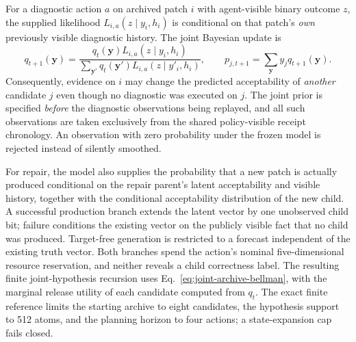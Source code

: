 \documentclass[pdflatex,sn-basic]{sn-jnl}
\begin{document}
For a diagnostic action $a$ on archived patch $i$ with
agent-visible binary outcome $z$, the supplied likelihood
$L_{i,a}(z\mid y_i,h_i)$ is conditional on that patch's
\emph{own} previously visible diagnostic history.
The joint Bayesian update is
\begin{equation}
 q_{t+1}(\mathbf y)
 =\frac{q_t(\mathbf y)L_{i,a}(z\mid y_i,h_i)}
 {\sum_{\mathbf y'}q_t(\mathbf y')
 L_{i,a}(z\mid y'_i,h_i)},\qquad
 p_{j,t+1}=\sum_{\mathbf y}y_j q_{t+1}(\mathbf y).
 \label{eq:joint-truth-update}
\end{equation}
Consequently, evidence on $i$ may change the predicted
acceptability of \emph{another} candidate $j$ even though
no diagnostic was executed on $j$. The joint prior is
specified \emph{before} the diagnostic observations being
replayed, and all such observations are taken exclusively
from the shared policy-visible receipt chronology. An
observation with zero probability under the frozen model
is rejected instead of silently smoothed.

For repair, the model also supplies the probability that a
new patch is actually produced conditional on the repair
parent's latent acceptability and visible history, together
with the conditional acceptability distribution of the
new child. A successful production branch extends the
latent vector by one unobserved child bit; failure
conditions the existing vector on the publicly visible
fact that no child was produced. Target-free generation
is restricted to a forecast independent of the existing
truth vector. Both branches spend the action's nominal
five-dimensional resource reservation, and neither
reveals a child correctness label. The resulting finite
joint-hypothesis recursion uses
Eq.~\eqref{eq:joint-archive-bellman}, with the marginal
release utility of each candidate computed from $q_t$.
The exact finite reference limits the starting archive
to eight candidates, the hypothesis support to 512
atoms, and the planning horizon to four actions; a
state-expansion cap fails closed.
\end{document}
